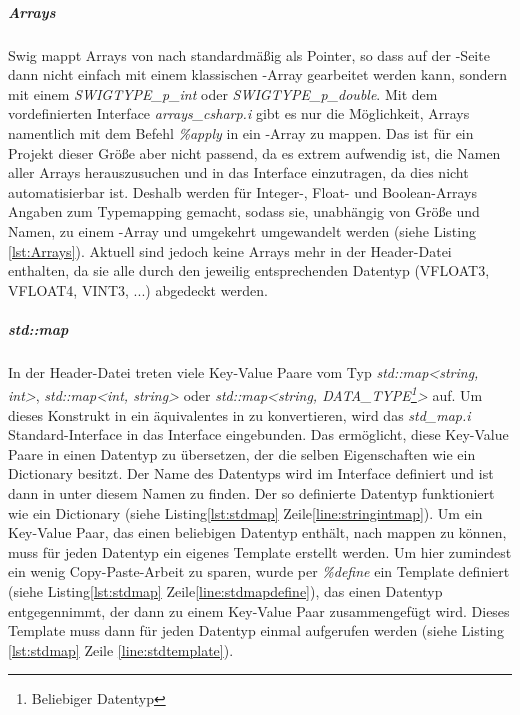\subparagraph{Arrays}
Swig mappt Arrays von \CC nach \CS standardmäßig als Pointer, so dass auf der \CS-Seite dann nicht einfach mit einem klassischen \CS-Array gearbeitet werden kann, sondern mit einem \emph{SWIGTYPE\_p\_int} oder \emph{SWIGTYPE\_p\_double}. Mit dem vordefinierten Interface \emph{arrays\_csharp.i} gibt es nur die Möglichkeit, Arrays namentlich mit dem Befehl \emph{\%apply} in ein \CS-Array zu mappen. Das ist für ein Projekt dieser Größe aber nicht passend, da es extrem aufwendig ist, die Namen aller Arrays herauszusuchen und in das Interface einzutragen, da dies nicht automatisierbar ist. Deshalb werden für Integer-, Float- und Boolean-Arrays Angaben zum Typemapping gemacht, sodass sie, unabhängig von Größe und Namen, zu einem \CS-Array und umgekehrt umgewandelt werden (siehe Listing \ref{lst:Arrays}). Aktuell sind jedoch keine Arrays mehr in der Header-Datei enthalten, da sie alle durch den jeweilig entsprechenden Datentyp (VFLOAT3, VFLOAT4, VINT3, ...) abgedeckt werden.

\begin{code}[caption={Beispiel Arraymapping},label={lst:Arrays}, escapechar=|]
\end{code}

\subparagraph{std::map}

In der Header-Datei treten viele Key-Value Paare vom Typ \emph{std::map<string, int>}, \emph{std::map<int, string>} oder \emph{std::map<string, DATA\_TYPE\footnote{Beliebiger Datentyp}>} auf. Um dieses Konstrukt in ein äquivalentes in \CS zu konvertieren, wird das \emph{std\_map.i} Standard-Interface in das Interface eingebunden. Das ermöglicht, diese Key-Value Paare in einen Datentyp zu übersetzen, der die selben Eigenschaften wie ein \CS Dictionary besitzt. Der Name des Datentyps wird im Interface definiert und ist dann in \CS unter diesem Namen zu finden. Der so definierte Datentyp funktioniert wie ein Dictionary (siehe Listing\ref{lst:stdmap} Zeile\ref{line:stringintmap}). Um ein Key-Value Paar, das einen beliebigen Datentyp enthält, nach \CS mappen zu können, muss für jeden Datentyp ein eigenes Template erstellt werden. Um hier zumindest ein wenig Copy-Paste-Arbeit zu sparen, wurde per \emph{\%define} ein Template definiert (siehe Listing\ref{lst:stdmap} Zeile\ref{line:stdmapdefine}), das einen Datentyp entgegennimmt, der dann zu einem Key-Value Paar zusammengefügt wird. Dieses Template muss dann für jeden Datentyp einmal aufgerufen werden (siehe Listing \ref{lst:stdmap} Zeile \ref{line:stdtemplate}). 


